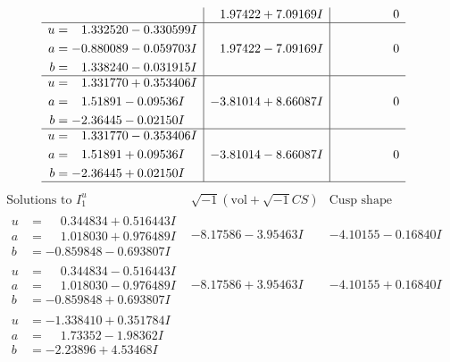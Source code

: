 \documentclass[1p]{elsarticle_modified}
\theoremstyle{definition}
\newcommand{\I}{\sqrt{-1}}
\begin{document}
$$\begin{array}{c|c|c}
 & \phantom{-}1.97422 + 7.09169 I & \phantom{-0.000000 } 0 \\ \hline\begin{aligned}
u &= \phantom{-}1.332520 - 0.330599 I \\
a &= -0.880089 - 0.059703 I \\
b &= \phantom{-}1.338240 - 0.031915 I\end{aligned}
 & \phantom{-}1.97422 - 7.09169 I & \phantom{-0.000000 } 0 \\ \hline\begin{aligned}
u &= \phantom{-}1.331770 + 0.353406 I \\
a &= \phantom{-}1.51891 - 0.09536 I \\
b &= -2.36445 - 0.02150 I\end{aligned}
 & -3.81014 + 8.66087 I & \phantom{-0.000000 } 0 \\ \hline\begin{aligned}
u &= \phantom{-}1.331770 - 0.353406 I \\
a &= \phantom{-}1.51891 + 0.09536 I \\
b &= -2.36445 + 0.02150 I\end{aligned}
 & -3.81014 - 8.66087 I & \phantom{-0.000000 } 0\\
 \hline 
 \end{array}$$\newpage$$\begin{array}{c|c|c}  
\text{Solutions to }I^u_{1}& \I (\text{vol} + \sqrt{-1}CS) & \text{Cusp shape}\\
 \hline 
\begin{aligned}
u &= \phantom{-}0.344834 + 0.516443 I \\
a &= \phantom{-}1.018030 + 0.976489 I \\
b &= -0.859848 - 0.693807 I\end{aligned}
 & -8.17586 - 3.95463 I & -4.10155 - 0.16840 I \\ \hline\begin{aligned}
u &= \phantom{-}0.344834 - 0.516443 I \\
a &= \phantom{-}1.018030 - 0.976489 I \\
b &= -0.859848 + 0.693807 I\end{aligned}
 & -8.17586 + 3.95463 I & -4.10155 + 0.16840 I \\ \hline\begin{aligned}
u &= -1.338410 + 0.351784 I \\
a &= \phantom{-}1.73352 - 1.98362 I \\
b &= -2.23896 + 4.53468 I\end{aligned}

\end{array}$$
\end{document}
